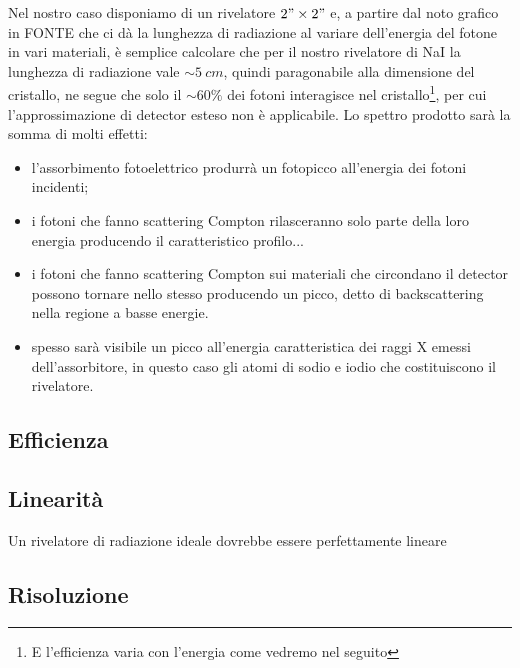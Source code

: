  Nel nostro caso disponiamo di un rivelatore $2"\times2"$ e, a partire dal noto grafico in FONTE che ci dà la lunghezza di radiazione al variare dell'energia del fotone in vari materiali, è semplice calcolare che per il nostro rivelatore di NaI la lunghezza di radiazione vale $\sim \SI{5}{cm}$, quindi paragonabile alla dimensione del cristallo, ne segue che solo il $\sim 60\%$ dei fotoni interagisce nel cristallo\footnote{E l'efficienza varia con l'energia come vedremo nel seguito}, per cui l'approssimazione di detector esteso non è applicabile.
 Lo spettro prodotto sarà la somma di molti effetti:
 \begin{itemize}
 	\item l'assorbimento fotoelettrico produrrà un fotopicco all'energia dei fotoni incidenti;
 	\item i fotoni che fanno scattering Compton rilasceranno solo parte della loro energia producendo il caratteristico profilo...
 	\item i fotoni che fanno scattering Compton sui materiali che circondano il detector possono tornare nello stesso producendo un picco, detto di backscattering nella regione a basse energie.
 	\item spesso sarà visibile un picco all'energia caratteristica dei raggi X emessi dell'assorbitore, in questo caso gli atomi di sodio e iodio che costituiscono il rivelatore. 
 \end{itemize}
  
 
 \subsection{Efficienza}
 
 \subsection{Linearità}
 Un rivelatore di radiazione ideale dovrebbe essere perfettamente lineare 
 \subsection{Risoluzione}
 
 
 
 
 
